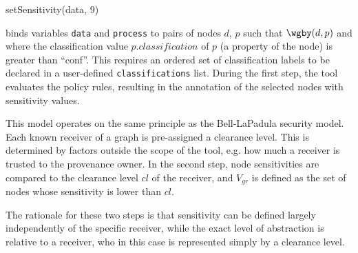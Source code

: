 \textsf{ \;\;\;\;\;\; setSensitivity(data, 9)}

\vspace{0.5\baselineskip}

\normalsize


binds variables \texttt{data} and \texttt{process} to pairs of nodes $d$, $p$ such that $\wgby(d,p)$ and where the classification value $p.classification$ of $p$ (a property of the node) is greater than ``conf''. This requires an ordered set of classification labels to be declared in a user-defined \texttt{classifications} list.
%
During the first step, the tool evaluates the policy rules, resulting in the annotation of the selected nodes with sensitivity values. 

%
This model operates on the same principle as the Bell-LaPadula security model. Each known receiver of a graph is pre-assigned a clearance level. This is determined by factors outside the scope of the tool, e.g. how much a receiver is trusted to the provenance owner. 
%
In the second step, node sensitivities are compared to the clearance level $cl$ of the receiver, and $V_{gr}$ is defined as the set of nodes whose sensitivity is lower than $cl$.
%

The rationale for these two steps is that sensitivity can be defined largely independently of the specific receiver, while the exact level of abstraction is relative to a receiver, who in this case is represented simply by a clearance level.

%
%
%
%
